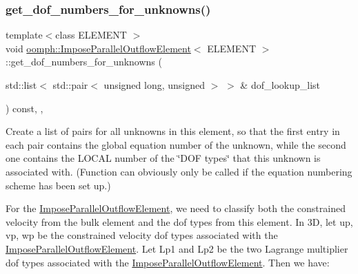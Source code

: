 \mbox{\label{classoomph_1_1ImposeParallelOutflowElement_a326aec64731513faa189b7a42856b0fe}} 
\subsubsection{\texorpdfstring{get\+\_\+dof\+\_\+numbers\+\_\+for\+\_\+unknowns()}{get\_dof\_numbers\_for\_unknowns()}}
{\footnotesize\ttfamily template$<$class E\+L\+E\+M\+E\+NT $>$ \\
void \hyperlink{classoomph_1_1ImposeParallelOutflowElement}{oomph\+::\+Impose\+Parallel\+Outflow\+Element}$<$ E\+L\+E\+M\+E\+NT $>$\+::get\+\_\+dof\+\_\+numbers\+\_\+for\+\_\+unknowns (\begin{DoxyParamCaption}\item[{std\+::list$<$ std\+::pair$<$ unsigned long, unsigned $>$ $>$ \&}]{dof\+\_\+lookup\+\_\+list }\end{DoxyParamCaption}) const\hspace{0.3cm}{\ttfamily [inline]}, {\ttfamily [protected]}, {\ttfamily [virtual]}}



Create a list of pairs for all unknowns in this element, so that the first entry in each pair contains the global equation number of the unknown, while the second one contains the L\+O\+C\+AL number of the \char`\"{}\+D\+O\+F types\char`\"{} that this unknown is associated with. (Function can obviously only be called if the equation numbering scheme has been set up.) 

For the \hyperlink{classoomph_1_1ImposeParallelOutflowElement}{Impose\+Parallel\+Outflow\+Element}, we need to classify both the constrained velocity from the bulk element and the dof types from this element. In 3D, let up, vp, wp be the constrained velocity dof types associated with the \hyperlink{classoomph_1_1ImposeParallelOutflowElement}{Impose\+Parallel\+Outflow\+Element}. Let Lp1 and Lp2 be the two Lagrange multiplier dof types associated with the \hyperlink{classoomph_1_1ImposeParallelOutflowElement}{Impose\+Parallel\+Outflow\+Element}. Then we have\+:

